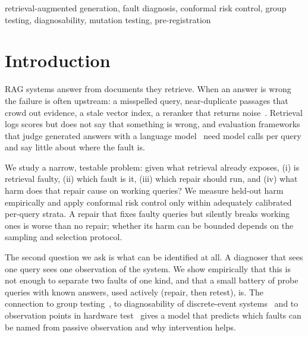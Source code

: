 \documentclass[conference]{IEEEtran}
\begin{document}
\begin{abstract}
injected faults at AUROC 0.977, against 0.734 for an existing system's retrieval features. All analyses were pre-registered with code hashes, and every failure is reported.
\end{abstract}

\begin{IEEEkeywords}
retrieval-augmented generation, fault diagnosis, conformal risk control, group testing, diagnosability, mutation testing, pre-registration
\end{IEEEkeywords}

\section{Introduction}
RAG systems answer from documents they retrieve. When an answer is wrong the failure is often upstream: a misspelled query, near-duplicate passages that crowd out evidence, a stale vector index, a reranker that returns noise~\cite{barnett2024seven}. Retrieval logs scores but does not say that something is wrong, and evaluation frameworks that judge generated answers with a language model~\cite{es2023ragas,saadfalcon2024ares} need model calls per query and say little about where the fault is.

We study a narrow, testable problem: given what retrieval already exposes, (i) is retrieval faulty, (ii) which fault is it, (iii) which repair should run, and (iv) what harm does that repair cause on working queries? We measure held-out harm empirically and apply conformal risk control only within adequately calibrated per-query strata. A repair that fixes faulty queries but silently breaks working ones is worse than no repair; whether its harm can be bounded depends on the sampling and selection protocol.

The second question we ask is what can be identified at all. A diagnoser that sees one query sees one observation of the system. We show empirically that this is not enough to separate two faults of one kind, and that a small battery of probe queries with known answers, used actively (repair, then retest), is. The connection to group testing~\cite{dorfman1943,du2000group}, to diagnosability of discrete-event systems~\cite{sampath1995diagnosability} and to observation points in hardware test~\cite{bushnell2000essentials} gives a model that predicts which faults can be named from passive observation and why intervention helps.
\end{document}
